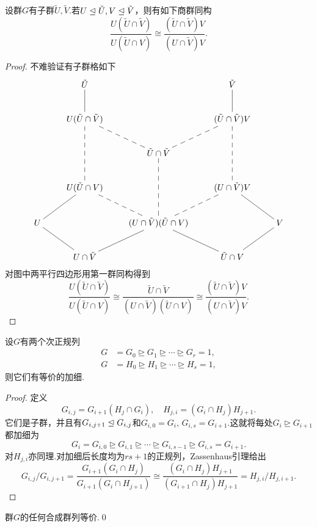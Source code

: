 \begin{lemma*}[(Zassenhaus)]
	设群$G$有子群$\tilde{U},\tilde{V}$.若$U\trianglelefteq\tilde{U},V\trianglelefteq\tilde{V}$，则有如下商群同构
	\[
		\frac{U(\tilde{U}\cap\tilde{V})}{U(\tilde{U}\cap V)}\cong\frac{(\tilde{U}\cap\tilde{V})V}{(U\cap\tilde{V})V}.
	\]
\end{lemma*}
\begin{proof}
	不难验证有子群格如下
	\[
		\xymatrix{
			&\tilde{U}\ar@{-}[d]&&\tilde{V}\ar@{-}[d]&\\
			&U(\tilde{U}\cap\tilde{V})\ar@{--}[dd]\ar@{--}[rd]&&(\tilde{U}\cap\tilde{V})V\ar@{--}[dd]\ar@{--}[ld]&\\
			&&\tilde{U}\cap\tilde{V}\ar@{--}[dd]&&\\
			&U(\tilde{U}\cap V)\ar@{-}[ld]\ar@{--}[rd]&&(U\cap\tilde{V})V\ar@{--}[ld]\ar@{-}[rd]&\\
			U\ar@{-}[rd]&&(U\cap\tilde{V})(\tilde{U}\cap V)\ar@{-}[ld]\ar@{-}[rd]&&V\ar@{-}[ld]\\
			&U\cap\tilde{V}&&\tilde{U}\cap V&
		}
	\]
	对图中两平行四边形用第一群同构得到
	\begin{equation*}
		\frac{U(\tilde{U}\cap\tilde{V})}{U(\tilde{U}\cap V)}\cong\frac{\tilde{U}\cap\tilde{V}}{(U\cap\tilde{V})(\tilde{U}\cap V)}\cong\frac{(\tilde{U}\cap\tilde{V})V}{(U\cap\tilde{V})V}.
	\end{equation*}
\end{proof}
\begin{thm}[(Schreier加细)]
	设$G$有两个次正规列
	\begin{align*}
		G & =G_0\trianglerighteq G_1\trianglerighteq\cdots\trianglerighteq G_r=1, \\
		G & =H_0\trianglerighteq H_1\trianglerighteq\cdots\trianglerighteq H_s=1,
	\end{align*}
	则它们有等价的加细.
\end{thm}
\begin{proof}
	定义
	\[
		G_{i,j}=G_{i+1}(H_j\cap G_i),\quad H_{j,i}=(G_i\cap H_j)H_{j+1}.
	\]
	它们是子群，并且有$G_{i,j+1}\trianglelefteq G_{i,j}$和$G_{i,0}=G_i,\,G_{i,s}=G_{i+1}$.这就将每处$G_i\trianglerighteq G_{i+1}$都加细为
	\[
		G_i=G_{i,0}\trianglerighteq G_{i,1}\trianglerighteq \cdots\trianglerighteq G_{i,s-1}\trianglerighteq G_{i,s}=G_{i+1}.
	\]
	对$H_{j,i}$亦同理.对加细后长度均为$rs+1$的正规列，Zassenhaus引理给出
	\begin{equation*}
		G_{i,j}/G_{i,j+1}=\frac{G_{i+1}(G_i\cap H_j)}{G_{i+1}(G_i\cap H_{j+1})}\cong\frac{(G_i\cap H_j)H_{j+1}}{(G_{i+1}\cap H_j)H_{j+1}}=H_{j,i}/H_{j,i+1}.
	\end{equation*}
\end{proof}
\begin{thm}
	群$G$的任何合成群列等价.\qed
\end{thm}

